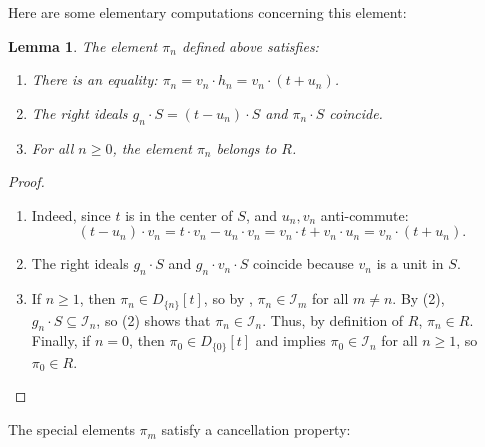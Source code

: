 \documentclass{amsart}
\newtheorem{lem}[equation]{Lemma}
\theoremstyle{definition}
\numberwithin{equation}{section}
\begin{document}
Here are some elementary computations concerning this element:
\begin{lem}\label{lem:piIdeal}
The element $\pi_n$ defined above satisfies:
\begin{enumerate}
\item There is an equality: $\pi_n = v_n \cdot h_n = v_n \cdot (t+u_n)$.
\item The right ideals $g_n\cdot S = (t-u_n)\cdot S$ and $\pi_n \cdot S$ coincide.
\item For all $n \ge 0$, the element $\pi_n$ belongs to $R$.
\end{enumerate}
\end{lem}
\begin{proof}\quad
\begin{enumerate}
\item Indeed, since $t$ is in the center of $S$,
and $u_n,v_n$ anti-commute:
\[
(t-u_n)\cdot v_n = t\cdot v_n -u_n\cdot v_n = v_n\cdot t + v_n\cdot u_n = v_n\cdot(t+u_n).
\]
\item The right ideals $g_n \cdot S$ and $g_n \cdot v_n \cdot S$ coincide because $v_n$ is a unit in $S$.
\item If $n \ge 1$, then $\pi_n \in D_{\{n\}}[t]$,
so by , $\pi_n \in \mathcal{I}_m$ for all $m \ne n$. By (2), $g_n\cdot S \subseteq \mathcal{I}_n$,
so (2) shows that $\pi_n \in \mathcal{I}_n$.
Thus, by definition of $R$, $\pi_n \in R$.
Finally, if $n = 0$, then $\pi_0 \in D_{\{0\}}[t]$ and  implies $\pi_0 \in \mathcal{I}_n$ for all $n\ge 1$, so $\pi_0 \in R$.
\end{enumerate}
\end{proof}

The special elements $\pi_m$ satisfy a cancellation property:
\end{document}
